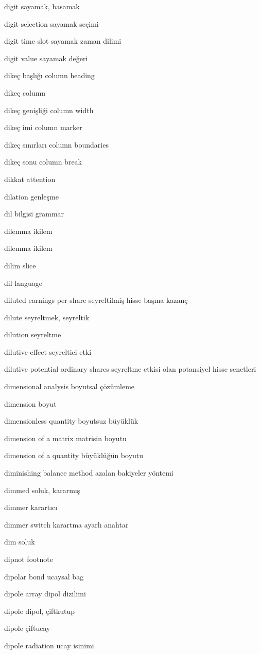 \documentclass[12pt,fleqn]{article}\usepackage{../../common}
\begin{document}
digit sayamak, basamak

digit selection sayamak seçimi

digit time slot sayamak zaman dilimi

digit value sayamak değeri

dikeç başlığı column heading

dikeç column

dikeç genişliği column width

dikeç imi column marker

dikeç sınırları column boundaries

dikeç sonu column break

dikkat attention

dilation genleşme

dil bilgisi grammar

dilemma ikilem

dilemma ikilem

dilim slice

dil language

diluted earnings per share seyreltilmiş hisse başına kazanç

dilute seyreltmek, seyreltik

dilution seyreltme

dilutive effect seyreltici etki

dilutive potential ordinary shares seyreltme etkisi olan potansiyel hisse senetleri

dimensional analysis boyutsal çözümleme

dimension boyut

dimensionless quantity boyutsuz büyüklük

dimension of a matrix matrisin boyutu

dimension of a quantity büyüklüğün boyutu

diminishing balance method azalan bakiyeler yöntemi

dimmed soluk, kararmış

dimmer karartıcı

dimmer switch karartma ayarlı anahtar

dim soluk

dipnot footnote

dipolar bond ucaysal bag

dipole array dipol dizilimi

dipole dipol, çiftkutup

dipole çiftucay

dipole radiation ucay isinimi
\end{document}
